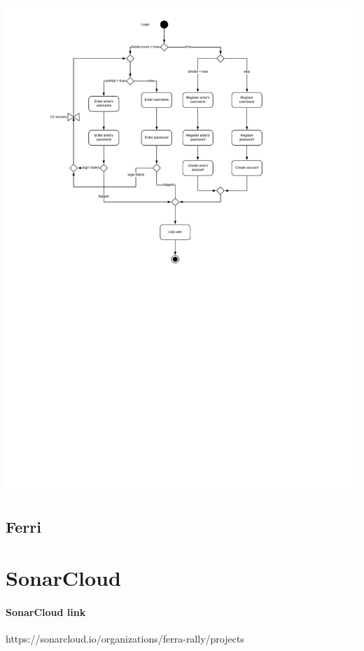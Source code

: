 \documentclass[11pt,a4paper]{article}
\begin{document}
\begin{itemize}
\includegraphics[scale=0.5]{logActivityDiagram.jpg}
\subsection{Ferri}
\section{SonarCloud}
\paragraph{SonarCloud link} https://sonarcloud.io/organizations/ferra-rally/projects
\end{itemize}
\end{document}
